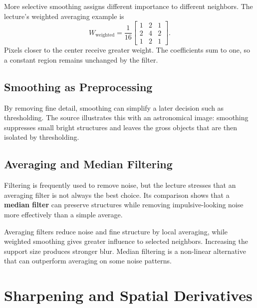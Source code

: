 \documentclass[11pt,a4paper,oneside]{report}
\begin{document}
More selective smoothing assigns different importance to different neighbors. The lecture's weighted averaging example is
\[
W_{\mathrm{weighted}}=\frac{1}{16}
\begin{bmatrix}
1&2&1\\
2&4&2\\
1&2&1
\end{bmatrix}.
\]
Pixels closer to the center receive greater weight. The coefficients sum to one, so a constant region remains unchanged by the filter.

\section{Smoothing as Preprocessing}

By removing fine detail, smoothing can simplify a later decision such as thresholding. The source illustrates this with an astronomical image: smoothing suppresses small bright structures and leaves the gross objects that are then isolated by thresholding.



\section{Averaging and Median Filtering}

Filtering is frequently used to remove noise, but the lecture stresses that an averaging filter is not always the best choice. Its comparison shows that a \textbf{median filter} can preserve structures while removing impulsive-looking noise more effectively than a simple average.



\FloatBarrier
\begin{chaptersummary}
Averaging filters reduce noise and fine structure by local averaging, while weighted smoothing gives greater influence to selected neighbors. Increasing the support size produces stronger blur. Median filtering is a non-linear alternative that can outperform averaging on some noise patterns.
\end{chaptersummary}

\chapter{Sharpening and Spatial Derivatives}
\end{document}
